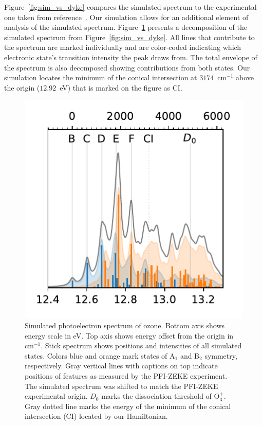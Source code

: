 \documentclass[
12pt,
a4paper,
prb,
superscriptaddress,
]{revtex4}
\begin{document}
Figure~\ref{fig:sim_vs_dyke} compares the simulated spectrum to the
experimental one taken from reference~\cite{dyke:O3:74}. Our simulation allows
for an additional element of analysis of the simulated spectrum.
Figure~\ref{fig:ozone_overlay} presents a decomposition of the simulated
spectrum from Figure~\ref{fig:sim_vs_dyke}. All lines that contribute to the
spectrum are marked individually and are color-coded indicating which
electronic state's transition intensity the peak draws from. The total
envelope of the spectrum is also decomposed showing contributions from both
states. Our simulation locates the minimum of the conical intersection at
$3174$~cm$^{-1}$ above the origin ($12.92$~eV) that is marked on the figure as
CI.

\begin{figure}
    \includegraphics[width=10 cm]{figures/spectrum_overline}
    \caption{
        Simulated photoelectron spectrum of ozone. Bottom axis shows energy
        scale in eV. Top axis shows energy offset from the origin in
        cm$^{-1}$. Stick spectrum shows positions and intensities of all
        simulated states. Colors blue and orange mark states of A$_1$ and
        B$_2$ symmetry, respectively. Gray vertical lines with captions on top
        indicate positions of features as measured by the PFI-ZEKE
        experiment.~\cite{Willitsch:O3ZEKE:2005} The simulated spectrum was
        shifted to match the PFI-ZEKE experimental origin. $D_0$ marks the
        dissociation threshold of O$_3^+$.~\cite{Willitsch:O3ZEKE:2005}
        Gray dotted line marks the energy of the minimum of the conical
        intersection (CI) located by our Hamiltonian.
    }
    \label{fig:ozone_overlay}
\end{figure}
\end{document}
